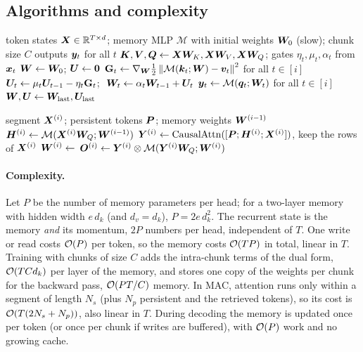 \subsection{Algorithms and complexity}

\begin{algorithm}[t]
\caption{Titans neural memory, chunk-parallel training of one layer (one head).}
\label{alg:c09-titans}
\begin{algorithmic}[1]
\Require token states $\bm{X}\in\mathbb{R}^{T\times d}$; memory MLP $\mathcal{M}$ with initial weights $\bm{W}_0$ (slow); chunk size $C$
\Ensure outputs $\bm{y}_t$ for all $t$
\State $\bm{K}, \bm{V}, \bm{Q} \gets \bm{X}\bm{W}_K, \bm{X}\bm{W}_V, \bm{X}\bm{W}_Q$; gates $\eta_t, \mu_t, \alpha_t$ from $\bm{x}_t$
\State $\bm{W} \gets \bm{W}_0$; $\bm{U} \gets \bm{0}$
  \State $\mathbf{G}_t \gets \nabla_{\bm{W}}\tfrac12\left\lVert \mathcal{M}(\bm{k}_t;\bm{W})-\bm{v}_t\right\rVert^2$ for all $t\in[i]$ 
  \State $\bm{U}_t \gets \mu_t\bm{U}_{t-1} - \eta_t\mathbf{G}_t$; $\ \bm{W}_t \gets \alpha_t\bm{W}_{t-1} + \bm{U}_t$ 
  \State $\bm{y}_t \gets \mathcal{M}(\bm{q}_t;\bm{W}_t)$ for all $t \in [i]$ 
  \State $\bm{W}, \bm{U} \gets \bm{W}_{\text{last}}, \bm{U}_{\text{last}}$
\EndFor
\end{algorithmic}
\end{algorithm}

\begin{algorithm}[t]
\caption{Titans MAC, processing segment $i$ (training or prefill).}
\label{alg:c09-mac}
\begin{algorithmic}[1]
\Require segment $\bm{X}^{(i)}$; persistent tokens $\bm{P}$; memory weights $\bm{W}^{(i-1)}$
\State $\bm{H}^{(i)} \gets \mathcal{M}(\bm{X}^{(i)}\bm{W}_Q; \bm{W}^{(i-1)})$ 
\State $\bm{Y}^{(i)} \gets \operatorname{CausalAttn}([\bm{P};\bm{H}^{(i)};\bm{X}^{(i)}])$, keep the rows of $\bm{X}^{(i)}$
\State $\bm{W}^{(i)} \gets$  
\State \Return $\bm{O}^{(i)} \gets \bm{Y}^{(i)} \otimes \mathcal{M}(\bm{Y}^{(i)}\bm{W}_Q; \bm{W}^{(i)})$
\end{algorithmic}
\end{algorithm}

\paragraph{Complexity.} Let $P$ be the number of memory parameters per head; for a two-layer
memory with hidden width $e\,d_k$ (and $d_v = d_k$), $P = 2e\,d_k^2$. The recurrent state is
the memory \emph{and} its momentum, $2P$ numbers per head, independent of $T$. One write or
read costs $\mathcal{O}(P)$ per token, so the memory costs $\mathcal{O}(TP)$ in total, linear in $T$.
Training with chunks of size $C$ adds the intra-chunk terms of the dual form,
$\mathcal{O}(T C d_k)$ per layer of the memory, and stores one copy of the weights per chunk for the
backward pass, $\mathcal{O}(PT/C)$ memory. In MAC, attention runs only within a segment of length
$N_s$ (plus $N_p$ persistent and the retrieved tokens), so its cost is
$\mathcal{O}(T(2N_s + N_p))$, also linear in $T$. During decoding the memory is updated once per
token (or once per chunk if writes are buffered), with $\mathcal{O}(P)$ work and no growing cache.

